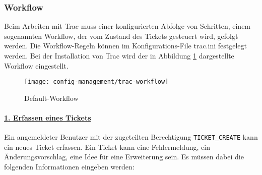 \subsubsection{Workflow}
Beim Arbeiten mit Trac muss einer konfigurierten Abfolge von Schritten,
einem sogenannten Workflow, der vom Zustand
des Tickets gesteuert wird, gefolgt werden. Die Workflow-Regeln können im
Konfigurations-File trac.ini festgelegt werden. Bei der
Installation von Trac wird der in Abbildung \ref{fig:trac-workflow}
dargestellte Workflow eingestellt.
\begin{figure}[H]
  \centering
  \texttt{[image: config-management/trac-workflow]}
  \caption{Default-Workflow}
  \label{fig:trac-workflow}
\end{figure}
%
\paragraph{\underline{1. Erfassen eines Tickets}}
Ein angemeldeter Benutzer mit der zugeteilten Berechtigung
\verb+TICKET_CREATE+ kann ein neues Ticket erfassen.
Ein Ticket kann eine Fehlermeldung, ein
  Änderungsvorschlag, eine Idee für eine Erweiterung sein.
  Es müssen dabei die folgenden Informationen
  eingeben werden:
